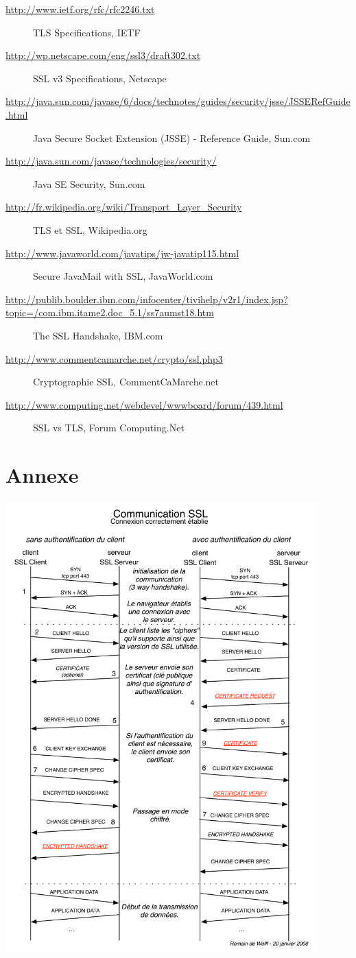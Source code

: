 \documentclass[10pt,a4paper,titlepage]{article}
\begin{document}
{\scriptsize
\begin{description}
	\item[\url{http://www.ietf.org/rfc/rfc2246.txt}] TLS Specifications, IETF
	\item[\url{http://wp.netscape.com/eng/ssl3/draft302.txt}] SSL v3 Specifications, Netscape
	\item[\url{http://java.sun.com/javase/6/docs/technotes/guides/security/jsse/JSSERefGuide.html}]	Java Secure Socket Extension (JSSE) - Reference Guide, Sun.com
	\item[\url{http://java.sun.com/javase/technologies/security/}] Java SE Security, Sun.com
	\item[\url{http://fr.wikipedia.org/wiki/Transport_Layer_Security}] {TLS et SSL, Wikipedia.org}
	\item[\url{http://www.javaworld.com/javatips/jw-javatip115.html}] Secure JavaMail with SSL, JavaWorld.com
	\item[\url{http://publib.boulder.ibm.com/infocenter/tivihelp/v2r1/index.jsp?topic=/com.ibm.itame2.doc_5.1/ss7aumst18.htm}] The SSL Handshake, IBM.com
	\item[\url{http://www.commentcamarche.net/crypto/ssl.php3}] Cryptographie SSL, CommentCaMarche.net
	\item[\url{http://www.computing.net/webdevel/wwwboard/forum/439.html}] SSL vs TLS, Forum Computing.Net
\end{description}
}

\section{Annexe}

\includegraphics[width=12cm]{CommunicationSSL.pdf} 
\end{document}
